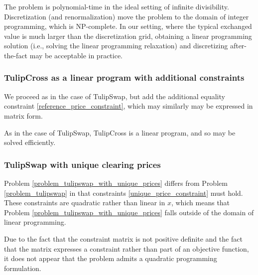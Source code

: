 \documentclass[11pt, reqno]{amsart}
\theoremstyle{definition}
\theoremstyle{remark}
\begin{document}
The problem is polynomial-time in the ideal setting of infinite divisibility.
Discretization (and renormalization) move the problem to the domain of
integer programming, which is NP-complete.
In our setting, where the typical exchanged value is much larger than the
discretization grid, obtaining a linear programming solution
(i.e., solving the linear programming relaxation) and
discretizing after-the-fact may be acceptable in practice.

\subsubsection{TulipCross as a linear program with additional constraints}

We proceed as in the case of TulipSwap, but add the additional equality
constraint \eqref{reference_price_constraint}, which may similarly
may be expressed in matrix form.

As in the case of TulipSwap, TulipCross is a linear program, and so may be solved
efficiently.

\subsubsection{TulipSwap with unique clearing prices}

Problem \ref{problem_tulipswap_with_unique_prices} differs from
Problem \ref{problem_tulipswap} in that constraints
\eqref{unique_price_constraint} must hold. These constraints are quadratic
rather than linear in $x$, which means that Problem
\ref{problem_tulipswap_with_unique_prices} falls outside of the domain of
linear programming.

Due to the fact that the constraint matrix is not positive definite and
the fact that the matrix expresses a constraint rather than part of an
objective function, it does not appear that the problem admits a
quadratic programming formulation.
\end{document}
